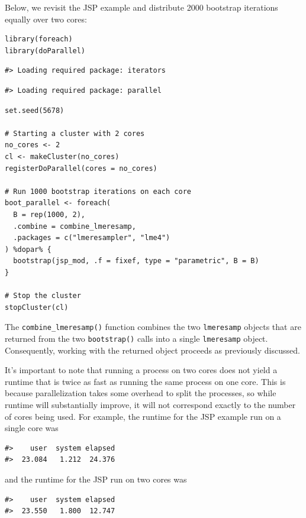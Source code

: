 Below, we revisit the JSP example and distribute 2000 bootstrap iterations equally over two cores:

\begin{verbatim}
library(foreach)
library(doParallel)
\end{verbatim}

\begin{verbatim}
#> Loading required package: iterators
\end{verbatim}

\begin{verbatim}
#> Loading required package: parallel
\end{verbatim}

\begin{verbatim}
set.seed(5678)

# Starting a cluster with 2 cores
no_cores <- 2
cl <- makeCluster(no_cores)
registerDoParallel(cores = no_cores)

# Run 1000 bootstrap iterations on each core
boot_parallel <- foreach(
  B = rep(1000, 2), 
  .combine = combine_lmeresamp,
  .packages = c("lmeresampler", "lme4")
) %dopar% {
  bootstrap(jsp_mod, .f = fixef, type = "parametric", B = B)
}

# Stop the cluster
stopCluster(cl)
\end{verbatim}

\noindent The \texttt{combine\_lmeresamp()} function combines the two \texttt{lmeresamp} objects that are returned from the two \texttt{bootstrap()} calls into a single \texttt{lmeresamp} object. Consequently, working with the returned object proceeds as previously discussed.

It's important to note that running a process on two cores does not yield a runtime that is twice as fast as running the same process on one core. This is because parallelization takes some overhead to split the processes, so while runtime will substantially improve, it will not correspond exactly to the number of cores being used. For example, the runtime for the JSP example run on a single core was

\begin{verbatim}
#>    user  system elapsed 
#>  23.084   1.212  24.376
\end{verbatim}

\noindent and the runtime for the JSP run on two cores was

\begin{verbatim}
#>    user  system elapsed 
#>  23.550   1.800  12.747
\end{verbatim}

